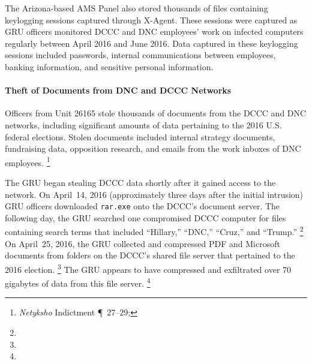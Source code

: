 
The Arizona-based AMS Panel also stored thousands of files containing keylogging sessions captured through X-Agent.
These sessions were captured as GRU officers monitored DCCC and DNC employees' work on infected computers regularly between April 2016 and June 2016.
Data captured in these keylogging sessions included passwords, internal communications between employees, banking information, and sensitive personal information.

\paragraph{Theft of Documents from DNC and DCCC Networks}

Officers from Unit 26165 stole thousands of documents from the DCCC and DNC networks, including significant amounts of data pertaining to the 2016 U.S. federal elections.
Stolen documents included internal strategy documents, fundraising data, opposition research, and emails from the work inboxes of DNC employees.%
\footnote{\textit{Netyksho} Indictment \P~27--29; }

The GRU began stealing DCCC data shortly after it gained access to the network.
On April~14, 2016 (approximately three days after the initial intrusion) GRU officers downloaded \verb+rar.exe+ onto the DCCC's document server.
The following day, the GRU searched one compromised DCCC computer for files containing search terms that included ``Hillary,'' ``DNC,'' ``Cruz,'' and ``Trump.''%
\footnote{}
On April~25, 2016, the GRU collected and compressed PDF and Microsoft documents from folders on the DCCC's shared file server that pertained to the 2016 election.%
\footnote{}
The GRU appears to have compressed and exfiltrated over 70 gigabytes of data from this file server.%
\footnote{}

